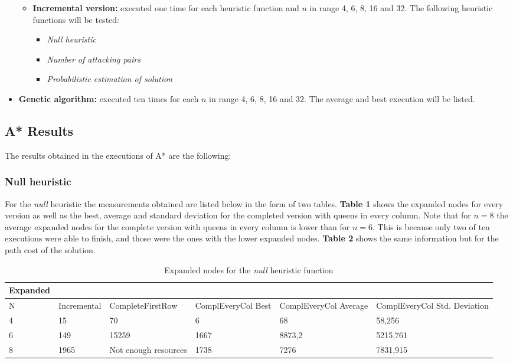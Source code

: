\documentclass[]{llncs}
\begin{document}
\begin{itemize}
\begin{itemize}
        \item \textbf{Incremental version:} executed one time for each heuristic function and $n$ in range 4, 6, 8, 16 and 32. The following heuristic functions will be tested:
        \begin{itemize}
            \item \textit{Null heuristic}
            \item \textit{Number of attacking pairs}
            \item \textit{Probabilistic estimation of solution}
        \end{itemize}
    \end{itemize}
    \item \textbf{Genetic algorithm:} executed ten times for each $n$ in range 4, 6, 8, 16 and 32. The average and best execution will be listed.
\end{itemize}
\subsection{A* Results}\label{astar_results}
The results obtained in the executions of A* are the following:
\subsubsection{Null heuristic}
For the \textit{null} heuristic the measurements obtained are listed below in the form of two tables. \textbf{Table 1} shows the expanded nodes for every version as well as the best, average and standard deviation for the completed version with queens in every column. Note that for $n = 8$ the average expanded nodes for the complete version with queens in every column is lower than for $n = 6$. This is because only two of ten executions were able to finish, and those were the ones with the lower expanded nodes. \textbf{Table 2} shows the same information but for the path cost of the solution.

\begin{table}[]
\caption{Expanded nodes for the \textit{null} heuristic function}
\centering
\begin{tabular}{llllll}
Expanded &             &                      &                       &                          &                                 \\ \hline
N        & Incremental & CompleteFirstRow     & ComplEveryCol Best    & ComplEveryCol Average    & ComplEveryCol Std. Deviation    \\ \hline
4        & 15          & 70                   & 6                     & 68                       & 58,256                          \\
6        & 149         & 15259                & 1667                  & 8873,2                   & 5215,761                        \\
8        & 1965        & Not enough resources & 1738                  & 7276                     & 7831,915                       
\end{tabular}
\label{tab:h0-expanded}
\end{table}
\end{document}

